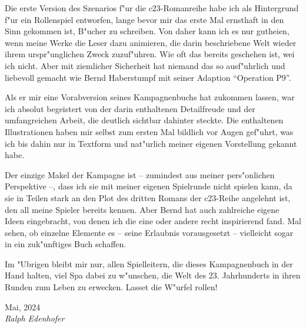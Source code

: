 
Die erste Version des Szenarios f"ur die c23-Romanreihe habe ich als Hintergrund f"ur ein Rollenspiel entworfen, lange bevor mir das erste Mal ernsthaft in den Sinn gekommen ist, B"ucher zu schreiben. Von daher kann ich es nur guthei\3en, wenn meine Werke die Leser dazu animieren, die darin beschriebene Welt wieder ihrem urspr"unglichen Zweck zuzuf"uhren. Wie oft das bereits geschehen ist, wei\3 ich nicht. Aber mit ziemlicher Sicherheit hat niemand das so ausf"uhrlich und liebevoll gemacht wie Bernd Haberstumpf mit seiner Adaption "`Operation P9"'.

Als er mir eine Vorabversion seines Kampagnenbuchs hat zukommen lassen, war ich absolut begeistert von der darin enthaltenen Detailfreude und der umfangreichen Arbeit, die deutlich sichtbar dahinter steckte. Die enthaltenen Illustrationen haben mir selbst zum ersten Mal bildlich vor Augen gef"uhrt, was ich bis dahin nur in Textform und nat"urlich meiner eigenen Vorstellung gekannt habe.

Der einzige Makel der Kampagne ist -- zumindest aus meiner pers"onlichen Perspektive --, dass ich sie mit meiner eigenen Spielrunde nicht spielen kann, da sie in Teilen stark an den Plot des dritten Romans der c23-Reihe angelehnt ist, den all meine Spieler bereits kennen. Aber Bernd hat auch zahlreiche eigene Ideen eingebracht, von denen ich die eine oder andere recht inspirierend fand. Mal sehen, ob einzelne Elemente es -- seine Erlaubnis vorausgesetzt -- vielleicht sogar in ein zuk"unftiges Buch schaffen.

Im "Ubrigen bleibt mir nur, allen Spielleitern, die dieses Kampagnenbuch in der Hand halten, viel Spa\3 dabei zu w"unschen, die Welt des 23. Jahrhunderts in ihren Runden zum Leben zu erwecken. Lasset die W"urfel rollen!

\medskip
Mai, 2024\\
\emph{Ralph Edenhofer}
